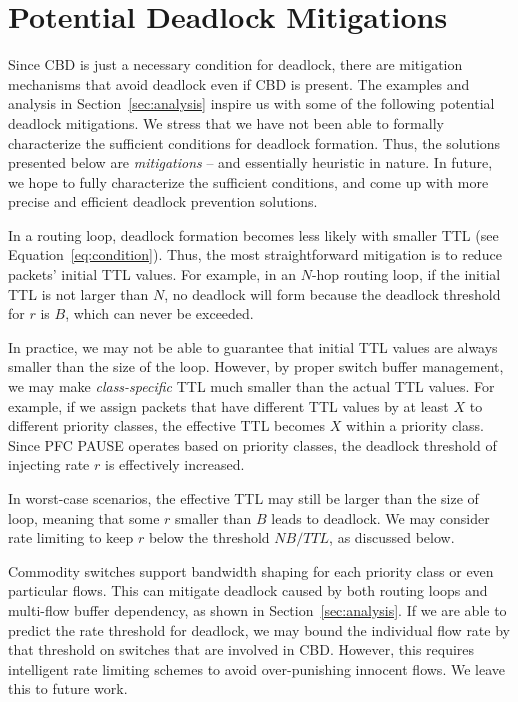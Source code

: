 \secspacelarge
\section{Potential Deadlock Mitigations}
\label{sec:mitigation}
\secspace

Since CBD is just a necessary condition for deadlock, there
are mitigation mechanisms that avoid deadlock even if CBD
is present.  The examples and analysis in Section~\ref{sec:analysis} inspire us
with some of the following potential deadlock mitigations.  We stress that we
have not been able to formally characterize the sufficient conditions for
deadlock formation. Thus, the solutions presented below are {\em mitigations} --
and essentially heuristic in nature. In future, we hope to fully characterize
the sufficient conditions, and come up with more precise and efficient deadlock
prevention solutions.

 In a routing loop,
deadlock formation becomes less likely with smaller TTL (see
Equation~\ref{eq:condition}).  Thus, the most straightforward mitigation is to
reduce packets' initial TTL values.  For example, in an $N$-hop routing loop, if
the initial TTL is not larger than $N$, no deadlock will form because the
deadlock threshold for $r$ is $B$, which can never be exceeded.

In practice, we may not be able to guarantee that initial TTL values are always
smaller than the size of the loop. However, by proper switch buffer management,
we may make {\em class-specific} TTL much smaller than the actual TTL values.
For example, if we assign packets that have different TTL values by at least $X$
to different priority classes, the effective TTL becomes $X$ within a priority
class. Since PFC PAUSE operates based on priority classes, the deadlock
threshold of injecting rate $r$ is effectively increased.

In worst-case scenarios, the effective TTL may still be larger than the size of
loop, meaning that some $r$ smaller than $B$ leads to deadlock. We may consider
rate limiting to keep $r$ below the threshold $NB/TTL$, as discussed below.

 Commodity switches support bandwidth shaping for each
priority class or even particular flows. This can mitigate deadlock caused by
both routing loops and multi-flow buffer dependency, as shown in
Section~\ref{sec:analysis}. If we are able to predict the rate threshold for
deadlock, we may bound the individual flow rate by that threshold on switches
that are involved in CBD. However, this requires
intelligent rate limiting schemes to avoid over-punishing innocent flows. We
leave this to future work.

